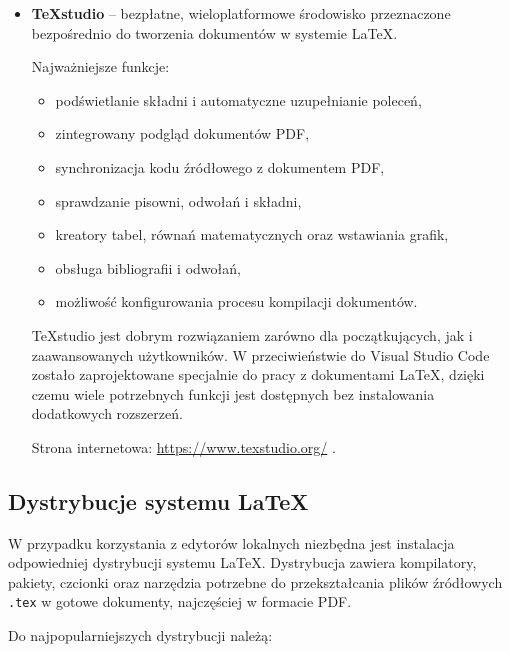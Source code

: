 \begin{itemize}
    \item \textbf{TeXstudio} -- bezpłatne, wieloplatformowe środowisko przeznaczone bezpośrednio do tworzenia dokumentów w systemie \LaTeX{}.

    Najważniejsze funkcje:
    \begin{itemize}
        \item podświetlanie składni i automatyczne uzupełnianie poleceń,
        \item zintegrowany podgląd dokumentów PDF,
        \item synchronizacja kodu źródłowego z dokumentem PDF,
        \item sprawdzanie pisowni, odwołań i składni,
        \item kreatory tabel, równań matematycznych oraz wstawiania grafik,
        \item obsługa bibliografii i odwołań,
        \item możliwość konfigurowania procesu kompilacji dokumentów.
    \end{itemize}

    TeXstudio jest dobrym rozwiązaniem zarówno dla początkujących, jak i zaawansowanych użytkowników. W przeciwieństwie do Visual Studio Code zostało zaprojektowane specjalnie do pracy z dokumentami \LaTeX{}, dzięki czemu wiele potrzebnych funkcji jest dostępnych bez instalowania dodatkowych rozszerzeń.

    Strona internetowa: \url{https://www.texstudio.org/} \cite{TeXstudioEditor}.

\end{itemize}


\subsection{Dystrybucje systemu LaTeX}

W przypadku korzystania z edytorów lokalnych niezbędna jest instalacja odpowiedniej dystrybucji systemu \LaTeX{}. Dystrybucja zawiera kompilatory, pakiety, czcionki oraz narzędzia potrzebne do przekształcania plików źródłowych \texttt{.tex} w gotowe dokumenty, najczęściej w formacie PDF.

Do najpopularniejszych dystrybucji należą:

